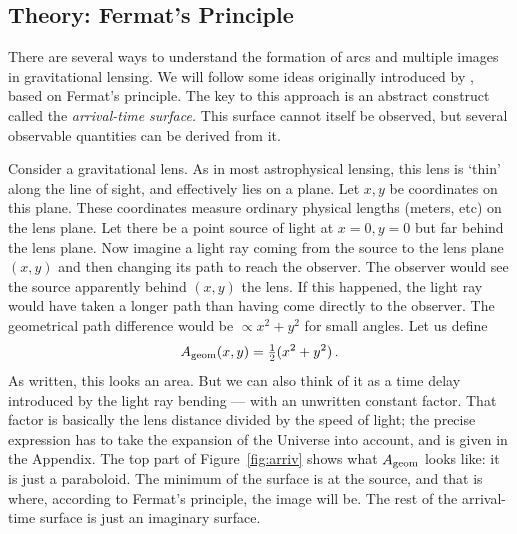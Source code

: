 \documentclass[12pt,preprint]{aastex}
\def\half{{\textstyle\frac12}}
\newcommand{\figref}[1]{Figure~\ref{fig:#1}}
\begin{document}
\subsection{Theory: Fermat's Principle} \label{sec:Fermat}

There are several ways to understand the formation of arcs and
multiple images in gravitational lensing.  We will follow some ideas
originally introduced by \cite{1986ApJ...310..568B}, based on Fermat's
principle.  The key to this approach is an abstract construct called
the {\em arrival-time surface.}  This surface cannot itself be
observed, but several observable quantities can be derived from it.

Consider a gravitational lens.  As in most astrophysical lensing, this
lens is `thin' along the line of sight, and effectively lies on a
plane.  Let $x,y$ be coordinates on this plane.  These coordinates
measure ordinary physical lengths (meters, etc) on the lens plane.
Let there be a point source of light at $x=0,y=0$ but far behind the
lens plane.  Now imagine a light ray coming from the source to the
lens plane $(x,y)$ and then changing its path to reach the observer.
The observer would see the source apparently behind $(x,y)$ the
lens.  If this happened, the light ray would have taken a longer path
than having come directly to the observer.  The geometrical path
difference would be $\propto x^2 + y^2$ for small angles.  Let us
define
\begin{equation} \label{eq:Ageom}
A_{\rm geom}(x,y) = \half(x^2 + y^2) \,.
\end{equation}
As written, this looks an area.  But we can also think of it as a
time delay introduced by the light ray bending --- with an unwritten
constant factor.  That factor is basically the lens distance divided by the
speed of light; the precise expression has to take the expansion of
the Universe into account, and is given in the Appendix.  The top part
of \figref{arriv} shows what $A_{\rm geom}$ looks like: it is
just a paraboloid.  The minimum of the surface is at the source, and
that is where, according to Fermat's principle, the image will be.
The rest of the arrival-time surface is just an imaginary surface.
\end{document}
